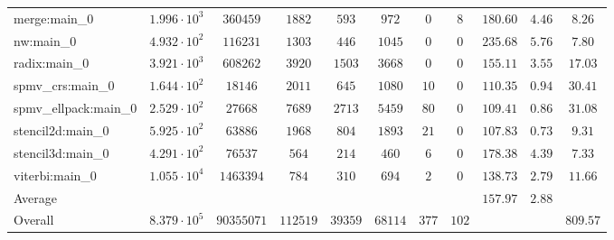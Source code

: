 \begin{tabular}{|l|c|c|c|c|c|c|c|c|c|c|}
merge:main\_0          & $ 1.996 \cdot 10^{3} $ & $ 360459   $ & $ 1882   $ & $ 593   $ & $ 972   $ & $ 0   $ & $ 8   $ & $ 180.60      $ & $ 4.46    $ & $ 8.26    $ \\
nw:main\_0             & $ 4.932 \cdot 10^{2} $ & $ 116231   $ & $ 1303   $ & $ 446   $ & $ 1045  $ & $ 0   $ & $ 0   $ & $ 235.68      $ & $ 5.76    $ & $ 7.80    $ \\
radix:main\_0          & $ 3.921 \cdot 10^{3} $ & $ 608262   $ & $ 3920   $ & $ 1503  $ & $ 3668  $ & $ 0   $ & $ 0   $ & $ 155.11      $ & $ 3.55    $ & $ 17.03   $ \\
spmv\_crs:main\_0      & $ 1.644 \cdot 10^{2} $ & $ 18146    $ & $ 2011   $ & $ 645   $ & $ 1080  $ & $ 10  $ & $ 0   $ & $ 110.35      $ & $ 0.94    $ & $ 30.41   $ \\
spmv\_ellpack:main\_0  & $ 2.529 \cdot 10^{2} $ & $ 27668    $ & $ 7689   $ & $ 2713  $ & $ 5459  $ & $ 80  $ & $ 0   $ & $ 109.41      $ & $ 0.86    $ & $ 31.08   $ \\
stencil2d:main\_0      & $ 5.925 \cdot 10^{2} $ & $ 63886    $ & $ 1968   $ & $ 804   $ & $ 1893  $ & $ 21  $ & $ 0   $ & $ 107.83      $ & $ 0.73    $ & $ 9.31    $ \\
stencil3d:main\_0      & $ 4.291 \cdot 10^{2} $ & $ 76537    $ & $ 564    $ & $ 214   $ & $ 460   $ & $ 6   $ & $ 0   $ & $ 178.38      $ & $ 4.39    $ & $ 7.33    $ \\
viterbi:main\_0        & $ 1.055 \cdot 10^{4} $ & $ 1463394  $ & $ 784    $ & $ 310   $ & $ 694   $ & $ 2   $ & $ 0   $ & $ 138.73      $ & $ 2.79    $ & $ 11.66   $ \\
\hline
Average                & $                    $ & $          $ & $        $ & $       $ & $       $ & $     $ & $     $ & $ 157.97      $ & $ 2.88    $ & $         $ \\
\hline
Overall                & $ 8.379 \cdot 10^{5} $ & $ 90355071 $ & $ 112519 $ & $ 39359 $ & $ 68114 $ & $ 377 $ & $ 102 $ & $             $ & $         $ & $ 809.57  $ \\
\hline
\end{tabular}

